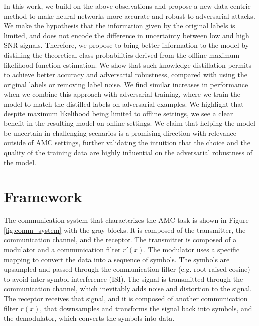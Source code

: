 \documentclass[conference]{IEEEtran}
\newcommand{\pf}[1]{{\textcolor{orange}{PF: {#1}}}}
\begin{document}
In this work, we build on the above observations and propose a new data-centric method to make neural networks more accurate and robust to adversarial attacks. We make the hypothesis that the information given by the original labels is limited, and does not encode the difference in uncertainty between low and high SNR signals. Therefore, we propose to bring better information to the model 
by distilling the theoretical class probabilities derived from the offline maximum likelihood function estimation. We show that such knowledge distillation permits to achieve better accuracy and adversarial robustness, compared with using the original labels or removing label noise. We find similar increases in performance when we combine this approach with adversarial training, where we train the model to match the distilled labels on adversarial examples. We highlight that despite maximum likelihood being limited to offline settings, we see a clear benefit in the resulting model on online settings. We claim that helping the model be uncertain in challenging scenarios is a promising direction with relevance outside of AMC settings, further validating the intuition that the choice and the quality of the training data are highly influential on the adversarial robustness of the model.


\section{Framework}


The communication system that characterizes the AMC task is shown in Figure \ref{fig:comm_system} with the gray blocks. It is composed of the transmitter, the communication channel, and the receptor. The transmitter is composed of a modulator and a communication filter $r'(x)$. The modulator uses a specific mapping to convert the data into a sequence of symbols. The symbols are upsampled and passed through the communication filter (e.g. root-raised cosine) to avoid inter-symbol interference (ISI). The signal is transmitted through the communication channel, which inevitably adds noise and distortion to the signal. The receptor receives that signal, and it is composed of another communication filter $r(x)$, that downsamples and transforms the signal back into symbols, and the demodulator, which converts the symbols into data. 
\end{document}
